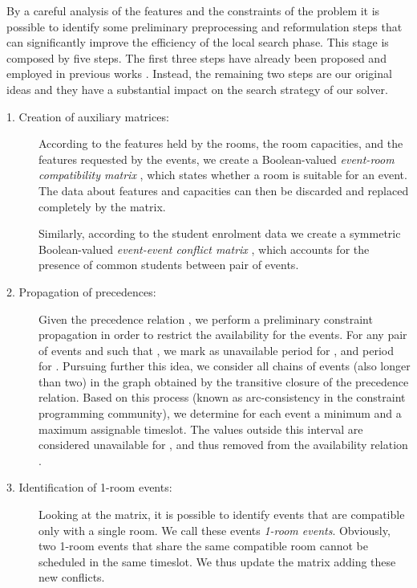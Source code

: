 \documentclass[authoryear,preprint,a4paper,12pt]{elsarticle}
\begin{document}
By a careful analysis of the features and the constraints of the
problem it is possible to identify some preliminary preprocessing and
reformulation steps that can significantly improve the efficiency of
the local search phase. This stage is composed by five steps. The
first three steps have already been proposed and employed in previous
works \citep[see, e.g.][]{Kost04}. Instead, the remaining two steps
are our original ideas and they have a substantial impact on the
search strategy of our solver.

\begin{description}

\item[1. Creation of auxiliary matrices:] According to the features held by
  the rooms, the room capacities, and the features requested by the
  events, we create a Boolean-valued \emph{event-room compatibility matrix} ,
  which states whether a room is suitable for an event. 
  The data about features and capacities can then
  be discarded and replaced completely by the  matrix.

  Similarly, according to the student enrolment data we create a symmetric Boolean-valued
  \emph{event-event conflict matrix} , which 
  accounts for the presence of common students between pair of events.

\item[2. Propagation of precedences:] Given the precedence relation
  , we perform a preliminary constraint propagation in order to
  restrict the availability for the events.  For any pair of events
   and  such that , we mark as unavailable
  period  for , and period  for .  Pursuing further
  this idea, we consider all chains of events (also longer than two)
  in the graph obtained by the transitive closure of the precedence
  relation.  Based on this process (known as arc-consistency in the
  constraint programming community), we determine for each event  a
  minimum and a maximum assignable timeslot. The values outside this
  interval are considered unavailable for , and thus removed from
  the availability relation .

\item[3. Identification of 1-room events:] Looking at the  matrix, it is
  possible to identify events that are compatible only with a single room. We call these events \emph{1-room events}. Obviously, two 1-room events that share the same
  compatible room  cannot be scheduled in the same timeslot. We
  thus update the  matrix adding these new conflicts.


\end{description}
\end{document}
